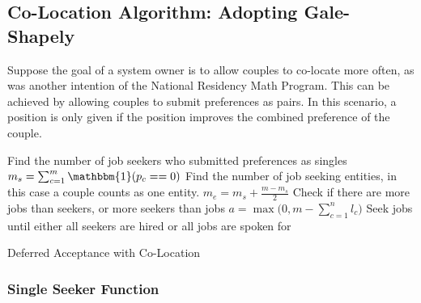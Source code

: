 \subsection{Co-Location Algorithm: Adopting Gale-Shapely}

Suppose the goal of a system owner is to allow couples to co-locate more often, as was another intention of the National Residency Math Program. This can be achieved by allowing couples to submit preferences as pairs. In this scenario, a position is only given if the position improves the combined preference of the couple.

\begin{algorithm}[H]
\SetAlgoLined
{} 
 Find the number of job seekers who submitted preferences as singles \;
 $m_s =  \sum_{c=1}^m \mathbbm{1}(p_c == 0)$ \;
 Find the number of job seeking entities, in this case a couple counts as one entity. \;
 $m_e = m_s + \frac{m - m_s}{2} $ \;
 Check if there are more jobs than seekers, or more seekers than jobs \;
 $a = \max \big(0, m - \sum_{c = 1}^n l_c \big)$\;
 Seek jobs until either all seekers are hired or all jobs are spoken for \;
 \caption{Deferred Acceptance with Co-Location}
\end{algorithm}

\subsubsection{Single Seeker Function}

